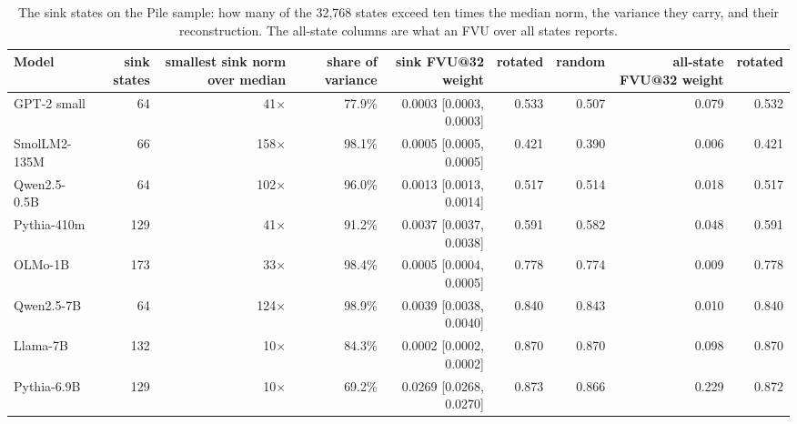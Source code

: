 \begin{table}[H]\centering\scriptsize
\caption{The sink states on the Pile sample: how many of the 32{,}768 states exceed ten times the median norm, the variance they carry, and their reconstruction. The all-state columns are what an FVU over all states reports.}\label{app:ci-sink-pile}
\begin{adjustbox}{max width=\linewidth}
\begin{tabular}{lrrrrrrrr}\toprule
Model & sink states & smallest sink norm over median & share of variance & sink FVU@32 weight & rotated & random & all-state FVU@32 weight & rotated \\ \midrule
GPT-2 small & 64 & 41$\times$ & 77.9\% & 0.0003 [0.0003, 0.0003] & 0.533 & 0.507 & 0.079 & 0.532 \\
SmolLM2-135M & 66 & 158$\times$ & 98.1\% & 0.0005 [0.0005, 0.0005] & 0.421 & 0.390 & 0.006 & 0.421 \\
Qwen2.5-0.5B & 64 & 102$\times$ & 96.0\% & 0.0013 [0.0013, 0.0014] & 0.517 & 0.514 & 0.018 & 0.517 \\
Pythia-410m & 129 & 41$\times$ & 91.2\% & 0.0037 [0.0037, 0.0038] & 0.591 & 0.582 & 0.048 & 0.591 \\
OLMo-1B & 173 & 33$\times$ & 98.4\% & 0.0005 [0.0004, 0.0005] & 0.778 & 0.774 & 0.009 & 0.778 \\
Qwen2.5-7B & 64 & 124$\times$ & 98.9\% & 0.0039 [0.0038, 0.0040] & 0.840 & 0.843 & 0.010 & 0.840 \\
Llama-7B & 132 & 10$\times$ & 84.3\% & 0.0002 [0.0002, 0.0002] & 0.870 & 0.870 & 0.098 & 0.870 \\
Pythia-6.9B & 129 & 10$\times$ & 69.2\% & 0.0269 [0.0268, 0.0270] & 0.873 & 0.866 & 0.229 & 0.872 \\
\bottomrule\end{tabular}\end{adjustbox}
\end{table}
